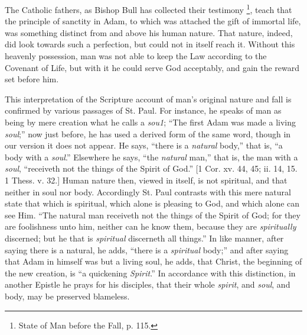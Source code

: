 The Catholic fathers, as Bishop Bull has collected their testimony
\footnote{State of Man before the Fall, p. 115.}, teach that the principle
of sanctity in Adam, to which was attached the gift of immortal life,
was something distinct from and above his human nature. That nature,
indeed, did look towards such a perfection, but could not in itself
reach it. Without this heavenly possession, man was not able to keep
the Law according to the Covenant of Life, but with it he could serve
God acceptably, and gain the reward set before him.

This interpretation of the Scripture account of man's original
nature and fall is confirmed by various passages of St. Paul. For
instance, he speaks of man as being by mere creation what he calls a \emph{sou1};
``The first Adam was made a living \emph{soul};'' now just
before, he has used a derived form of the same word, though in our
version it does not appear. He says, ``there is a \emph{natural}
body,'' that is, ``a body with a \emph{soul}.'' Elsewhere
he says, ``the \emph{natural} man,'' that is, the man with a \emph{soul},
``receiveth not the things of the Spirit of God.'' [1 Cor. xv.
44, 45; ii. 14, 15. 1 Thess. v. 32.] Human nature then, viewed in
itself, is not spiritual, and that neither in soul nor body.
Accordingly St. Paul contrasts with this mere natural state that which
is spiritual, which alone is pleasing to God, and which alone can see
Him. ``The natural man receiveth not the things of the Spirit
of God; for they are foolishness unto him, neither can he know
them, because they are \emph{spiritually} discerned; but he that is \emph{spiritual}
discerneth all things.'' In like manner, after saying there is a
natural, he adds, ``there is a \emph{spiritual} body;'' and
after saying that Adam in himself was but a living soul, he adds, that
Christ, the beginning of the new creation, is ``a quickening \emph{Spirit}.''
In accordance with this distinction, in another Epistle he prays for
his disciples, that their whole \emph{spirit}, and \emph{soul}, and
body, may be preserved blameless.


